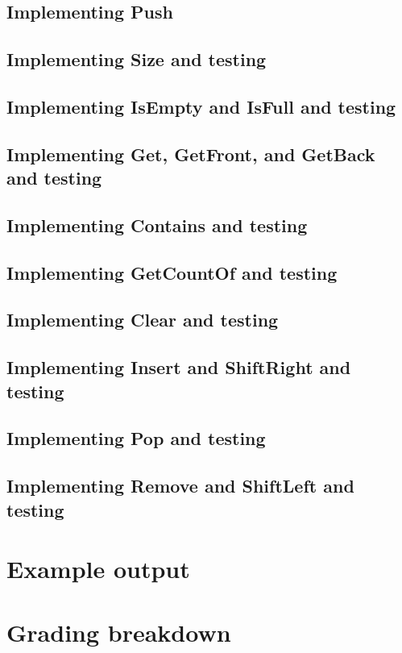         \section{Implementing Push}

        \section{Implementing Size and testing}

        \section{Implementing IsEmpty and IsFull and testing}

        \section{Implementing Get, GetFront, and GetBack and testing}

        \section{Implementing Contains and testing}

        \section{Implementing GetCountOf and testing}

        \section{Implementing Clear and testing}

        \section{Implementing Insert and ShiftRight and testing}

        \section{Implementing Pop and testing}

        \section{Implementing Remove and ShiftLeft and testing}
                
    \newpage

    \chapter{Example output}

    \chapter{Grading breakdown}


